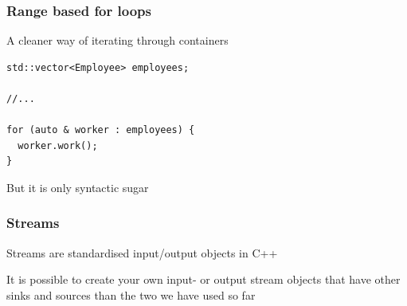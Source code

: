 \documentclass[14pt,a4paper,dvipsnames,usenames]{beamer}
\begin{document}
\begin{frame}[fragile]
  \frametitle{Range based for loops}
  
  A cleaner way of iterating through containers
  
  \vspace{.75cm}
  \begin{lstlisting}[morekeywords={Employee}]
std::vector<Employee> employees;

//...

for (auto & worker : employees) {
  worker.work();
}
  \end{lstlisting}

  \vspace{.5cm}
  But it is only syntactic sugar

  \CPPEleven

\end{frame}

\begin{frame}[fragile]
  \frametitle{Streams}

  Streams are standardised input/output objects in C++

  \vspace{1em}
  It is possible to create your own input- or output stream objects that
  have other sinks and sources than the two we have used so far
  
\end{frame}
\end{document}
